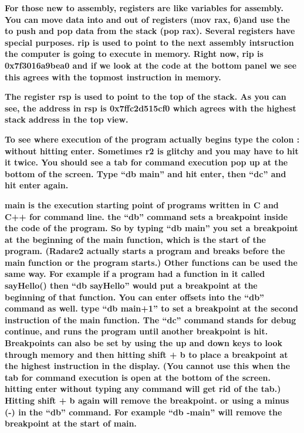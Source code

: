 \textbf{For those new to assembly, registers are like variables for assembly. You can move data into and out of
registers (mov rax, 6)and use the to push and pop data from the stack (pop rax). Several registers have special
purposes. rip is used to point to the next assembly intsruction the computer is going to execute in memory. Right now,
rip is 0x7f3016a9bea0 and if we look at the code at the bottom panel we see this agrees with the topmost instruction in
memory.}

  
 

\textbf{The register rsp is used to point to the top of the stack. As you can see, the address in rsp is 0x7ffc2d515cf0
which agrees with the highest stack address in the top view.}

  
 

\textbf{To see where execution of the program actually begins type the colon : without hitting enter. Sometimes r2 is
glitchy and you may have to hit it twice. You should see a tab for command execution pop up at the bottom of the
screen. Type ``db main'' and hit enter, then ``dc'' and hit enter again.}

  
 

\textbf{main is the execution starting point of programs written in C and C++ for command line. the ``db'' command sets
a breakpoint inside the code of the program. So by typing ``db main'' you set a breakpoint at the beginning of the main
function, which is the start of the program. (Radare2 actually starts a program and breaks before the main function or
the program starts.) Other functions can be used the same way. For example if a program had a function in it called
sayHello() then ``db sayHello'' would put a breakpoint at the beginning of that function. You can enter offsets into
the ``db'' command as well. type ``db main+1'' to set a breakpoint at the second instruction of the main function. The
``dc'' command stands for debug continue, and runs the program until another breakpoint is hit. Breakpoints can also be
set by using the up and down keys to look through memory and then hitting shift + b to place a breakpoint at the
highest instruction in the display. (You cannot use this when the tab for command execution is open at the bottom of
the screen. hitting enter without typing any command will get rid of the tab.) Hitting shift + b again will remove the
breakpoint. or using a minus (-) in the ``db'' command. For example ``db -main'' will remove the breakpoint at the
start of main.}

